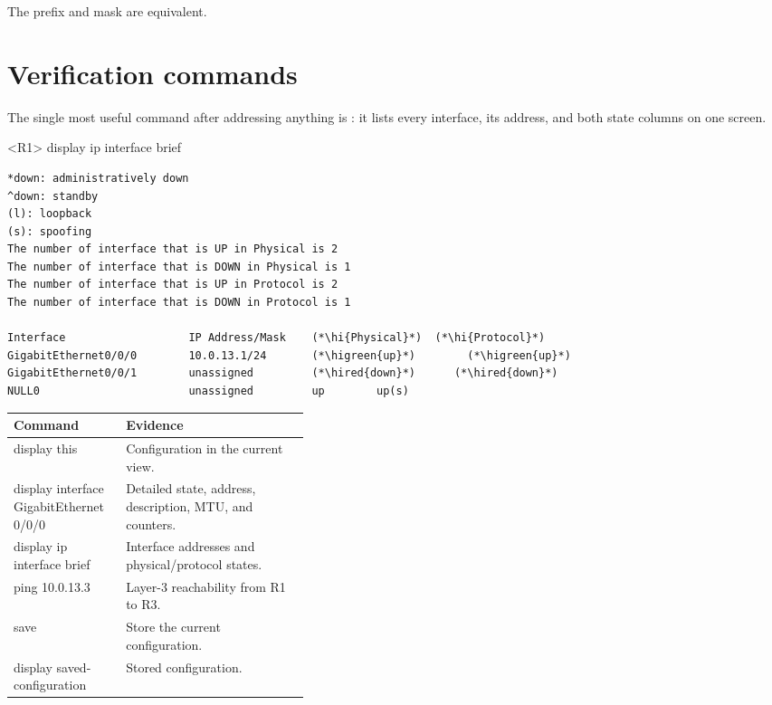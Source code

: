 The prefix  and mask  are equivalent.

\section{Verification commands}
The single most useful command after addressing anything is
: it lists every interface, its address,
and both state columns on one screen.

\begin{vrpbox}{<R1> display ip interface brief}
\begin{lstlisting}[style=dcnvrp]
*down: administratively down
^down: standby
(l): loopback
(s): spoofing
The number of interface that is UP in Physical is 2
The number of interface that is DOWN in Physical is 1
The number of interface that is UP in Protocol is 2
The number of interface that is DOWN in Protocol is 1

Interface                   IP Address/Mask    (*\hi{Physical}*)  (*\hi{Protocol}*)
GigabitEthernet0/0/0        10.0.13.1/24       (*\higreen{up}*)        (*\higreen{up}*)
GigabitEthernet0/0/1        unassigned         (*\hired{down}*)      (*\hired{down}*)
NULL0                       unassigned         up        up(s)
\end{lstlisting}
\end{vrpbox}


\begin{commandmap}
\begin{tabularx}{\linewidth}{>{\ttfamily}p{0.38\linewidth}X}
\toprule
Command & Evidence\\\midrule
 display this & Configuration in the current view.\\
 display interface GigabitEthernet 0/0/0 & Detailed state, address, description, MTU, and counters.\\
 display ip interface brief & Interface addresses and physical/protocol states.\\
 ping 10.0.13.3 & Layer-3 reachability from R1 to R3.\\
 save & Store the current configuration.\\
 display saved-configuration & Stored configuration.\\\bottomrule
\end{tabularx}
\end{commandmap}

